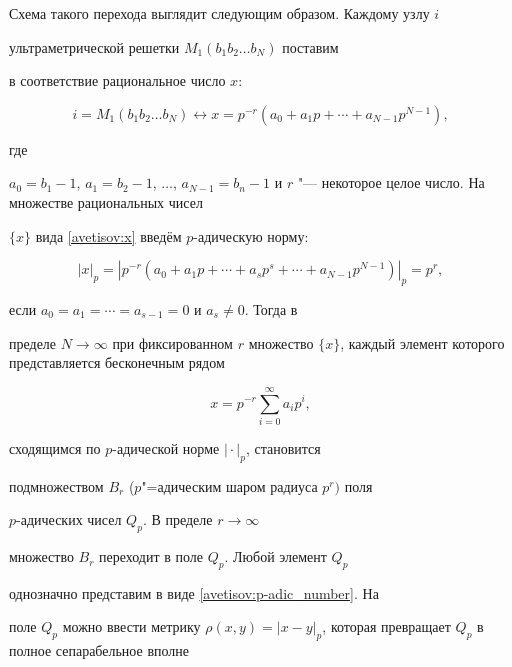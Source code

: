 Схема такого перехода выглядит следующим образом. Каждому узлу $i$

ультраметрической решетки $M_{1}(b_{1}b_{2}\ldots b_{N})$ поставим

в соответствие рациональное число $x$:

\begin{equation}

i=M_{1}(b_{1}b_{2}\ldots b_{N})\longleftrightarrow

x=p^{-r}\left(a_{0}+a_{1}p+\cdots+a_{N-1}p^{N-1}\right),\label{avetisov:x}

\end{equation}

где

$a_{0}=b_{1}-1$, $a_{1}=b_{2}-1$, $\ldots$, $a_{N-1}=b_{n}-1$ и $r$ "--- некоторое целое число. На множестве рациональных чисел

$\{ x\} $ вида \eqref{avetisov:x} введём $p$-адическую норму:


\[

|x|_{p}=\left|p^{-r}\left(a_{0}+a_{1}p+\cdots+a_{s}p^{s}+\cdots+a_{N-1}p^{N-1}\right)\right|_{p}=p^{r},

\]

если $a_{0}=a_{1}=\cdots=a_{s-1}=0$ и $a_{s}\neq0$. Тогда в

пределе $N\rightarrow\infty$ при фиксированном $r$ множество $\{

x\}$, каждый элемент которого представляется бесконечным рядом

\begin{equation}

x=p^{-r}\sum_{i=0}^{\infty}a_{i}p^{i},\label{avetisov:p-adic_number}

\end{equation}

сходящимся по $p$-адической норме $|{}\cdot{}|_{p}$, становится

подмножеством $B_{r}$ ($p$"=адическим шаром радиуса $p^{r})$ поля

$p$-адических чисел $Q_{p}$. В пределе $r\rightarrow\infty$

множество $B_{r}$ переходит в поле $Q_{p}$. Любой элемент $Q_{p}$

однозначно представим в виде \eqref{avetisov:p-adic_number}. На

поле $Q_{p}$ можно ввести метрику $\rho(x,y)=\vert x-y \vert

_{p}$, которая превращает $Q_{p}$ в полное сепарабельное вполне

